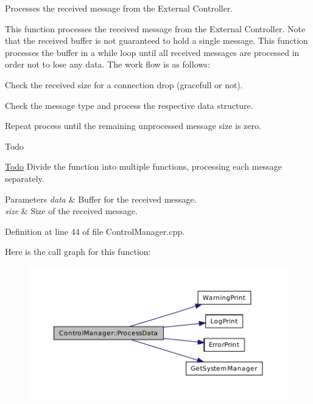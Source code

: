 Processes the received message from the External Controller. 

This function processes the received message from the External Controller. Note that the received buffer is not guaranteed to hold a single message. This function processes the buffer in a while loop until all received messages are processed in order not to lose any data. The work flow is as follows\-:
\begin{DoxyItemize}
\item Check the received size for a connection drop (gracefull or not).
\item Check the message type and process the respective data structure.
\item Repeat process until the remaining unprocessed message size is zero. \begin{DoxyRefDesc}{Todo}
\item[\hyperlink{todo__todo000002}{Todo}]Divide the function into multiple functions, processing each message separately.\end{DoxyRefDesc}



\begin{DoxyParams}{Parameters}
{\em data} & Buffer for the received message. \\
\hline
{\em size} & Size of the received message. \\
\hline
\end{DoxyParams}

\end{DoxyItemize}

Definition at line 44 of file Control\-Manager.\-cpp.



Here is the call graph for this function\-:\nopagebreak
\begin{figure}[H]
\begin{center}
\leavevmode
\includegraphics[width=350pt]{class_control_manager_a2dc55da1b01fd175b3d885c68b8a7524_cgraph}
\end{center}
\end{figure}




